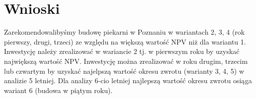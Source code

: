 \documentclass[a4paper]{article}
\begin{document}
\section{Wnioski}
Zarekomendowalibyśmy budowę piekarni w Poznaniu w wariantach 2, 3, 4 (rok pierwszy, drugi, trzeci) ze względu na większą wartość NPV niż dla wariantu 1. Inwestycję należy zrealizować w wariancie 2 tj. w pierwszym roku by uzyskać największą wartość NPV. Inwestycję można zrealizować w roku drugim, trzecim lub czwartym by uzyskać najelpszą wartość okresu zwrotu (warianty 3, 4, 5) w analizie 5 letniej. Dla analizy 6-cio letniej najlepszą wartość okresu zwrotu osiąga wariant 6 (budowa w piątym roku). 
{}

\end{document}

